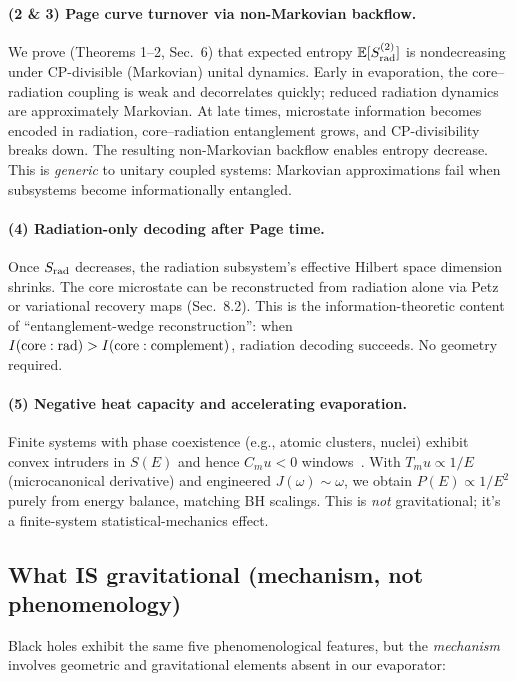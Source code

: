 \documentclass[aps,prx,onecolumn,showpacs,superscriptaddress,longbibliography,nofootinbib]{revtex4-2}
\def\mu{mu}%
\begin{document}
\paragraph{(2 \& 3) Page curve turnover via non-Markovian backflow.}
We prove (Theorems 1--2, Sec.~6) that expected entropy $\mathbb{E}[S^{(2)}_{\rm rad}]$ is nondecreasing under CP-divisible (Markovian) unital dynamics. Early in evaporation, the core--radiation coupling is weak and decorrelates quickly; reduced radiation dynamics are approximately Markovian. At late times, microstate information becomes encoded in radiation, core--radiation entanglement grows, and CP-divisibility breaks down. The resulting non-Markovian backflow enables entropy decrease. This is \emph{generic} to unitary coupled systems: Markovian approximations fail when subsystems become informationally entangled.

\paragraph{(4) Radiation-only decoding after Page time.}
Once $S_{\rm rad}$ decreases, the radiation subsystem's effective Hilbert space dimension shrinks. The core microstate can be reconstructed from radiation alone via Petz or variational recovery maps (Sec.~8.2). This is the information-theoretic content of ``entanglement-wedge reconstruction'': when $I({\rm core}:{\rm rad}) > I({\rm core}:{\rm complement})$, radiation decoding succeeds. No geometry required.

\paragraph{(5) Negative heat capacity and accelerating evaporation.}
Finite systems with phase coexistence (e.g., atomic clusters, nuclei) exhibit convex intruders in $S(E)$ and hence $C_\mu < 0$ windows~\cite{GrossBook2001,Schmidt2001Na147,DAgostino2000}. With $T_\mu \propto 1/E$ (microcanonical derivative) and engineered $J(\omega) \sim \omega$, we obtain $P(E) \propto 1/E^2$ purely from energy balance, matching BH scalings. This is \emph{not} gravitational; it's a finite-system statistical-mechanics effect.

\subsection{What IS gravitational (mechanism, not phenomenology)}

Black holes exhibit the same five phenomenological features, but the \emph{mechanism} involves geometric and gravitational elements absent in our evaporator:
\end{document}
